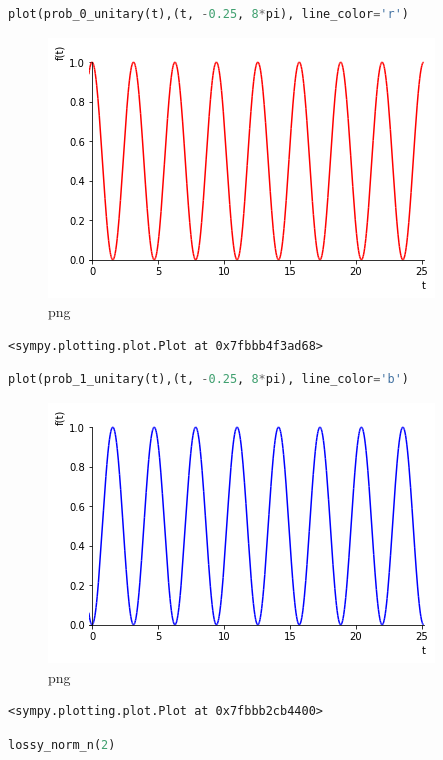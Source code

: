 \begin{lstlisting}[language=Python]
plot(prob_0_unitary(t),(t, -0.25, 8*pi), line_color='r')
\end{lstlisting}

\begin{figure}
\centering
\includegraphics[width=0.66\linewidth]{output_40_0.png}
\caption[]{png}
\end{figure}

\begin{lstlisting}
<sympy.plotting.plot.Plot at 0x7fbbb4f3ad68>
\end{lstlisting}

\begin{lstlisting}[language=Python]
plot(prob_1_unitary(t),(t, -0.25, 8*pi), line_color='b')
\end{lstlisting}

\begin{figure}
\centering
\includegraphics[width=0.66\linewidth]{output_41_0.png}
\caption[]{png}
\end{figure}

\begin{lstlisting}
<sympy.plotting.plot.Plot at 0x7fbbb2cb4400>
\end{lstlisting}

\begin{lstlisting}[language=Python]
lossy_norm_n(2)
\end{lstlisting}

